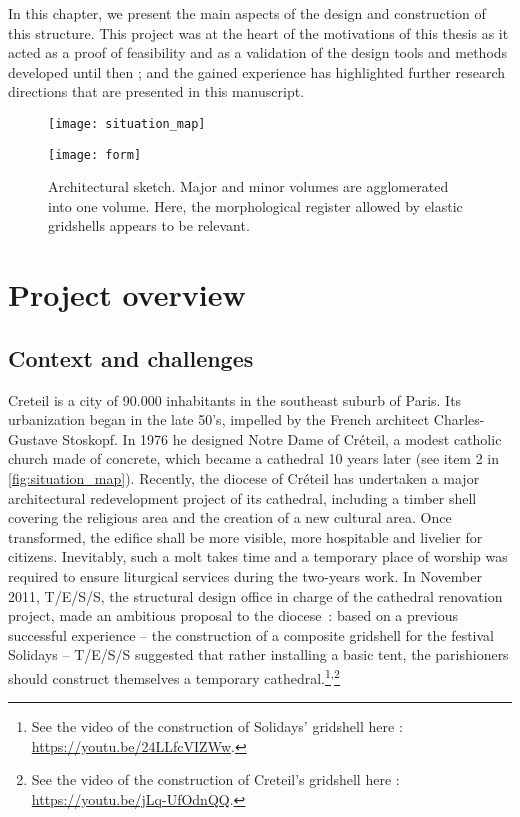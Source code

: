 In this chapter, we present the main aspects of the design and construction of this structure. This project was at the heart of the motivations of this thesis as it acted as a proof of feasibility and as a validation of the design tools and methods developed until then ; and the gained experience has highlighted further research directions that are presented in this manuscript.

\begin{figure}[p]
	\centering
	\captionsetup[subfloat]{captionskip=10pt}
	\begin{fullpage}
		\texttt{[image: situation\_map]}
		\caption{Situation map. The temporary gridshell (1) was built very close to the permanent cathedral (2). Remark that  the two buildings cover a quite similar projected area.}\label{fig:situation_map}    
		\vspace{1.5cm}
		\texttt{[image: form]}
		\caption{Architectural sketch. Major and minor volumes are agglomerated into one volume. Here, the morphological register allowed by elastic gridshells appears to be relevant.}\label{fig:form}    
	\end{fullpage} 
\end{figure}

\section{Project overview}
\subsection{Context and challenges}
Creteil is a city of 90.000 inhabitants in the southeast suburb of Paris. Its urbanization began in the late 50’s, impelled by the French architect Charles-Gustave Stoskopf. In 1976 he designed Notre Dame of Créteil, a modest catholic church made of concrete, which became a cathedral 10 years later (see item 2 in \cref{fig:situation_map}). Recently, the diocese of Créteil has undertaken a major architectural redevelopment project of its cathedral, including a timber shell covering the religious area and the creation of a new cultural area. Once transformed, the edifice shall be more visible, more hospitable and livelier for citizens. Inevitably, such a molt takes time and a temporary place of worship was required to ensure liturgical services during the two-years work. In November 2011, T/E/S/S, the structural design office in charge of the cathedral renovation project, made an ambitious proposal to the diocese~: based on a previous successful experience – the construction of a composite gridshell for the festival Solidays \cite{Baverel2012} – T/E/S/S suggested that rather installing a basic tent, the parishioners should construct themselves a temporary cathedral.\footnote{See the video of the construction of Solidays' gridshell here : \url{https://youtu.be/24LLfcVIZWw}.}\textsuperscript{,}\footnote{See the video of the construction of Creteil's gridshell here : \url{https://youtu.be/jLq-UfOdnQQ}.}

